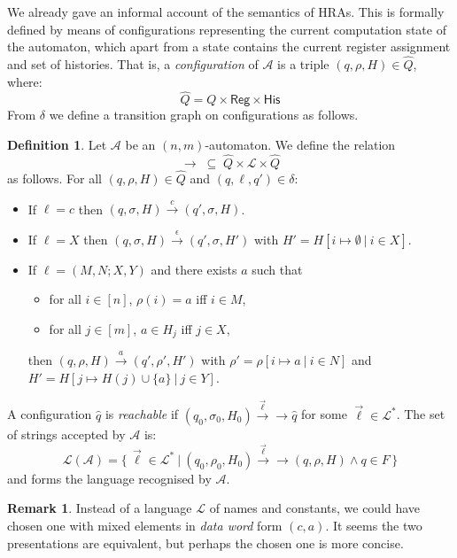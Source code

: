 \documentclass{article}
\theoremstyle{definition}
\newtheorem{remark}[theorem]{Remark}
\newtheorem{definition}[theorem]{Definition}
\renewcommand\AA{\mathcal{A}}
\newcommand\LL{\mathcal{L}}
\newcommand\trdelta[2][]{\overset{#2}\longrightarrow}
\newcommand\trdeltaa[2][]{\overset{#2}\longrightarrow\!\!\!\!\!\!\!\!\!\longrightarrow}
\newcommand\ells{\vec{\ell}}
\newcommand\reg{\mathsf{Reg}}
\newcommand\his{\mathsf{His}}
\newcommand\ta{,}
\begin{document}
We already gave an informal account of the semantics of HRAs. 
This is formally defined by means of {configurations} representing the current computation state of the automaton, which apart from a state contains the current register assignment and set of histories. That is,
a \emph{configuration} of $\AA$ is a triple $(q,\rho,H)\in\hat{Q}$, where:
\[ \hat{Q}=Q\times\reg \times \his\]
From $\delta$ we define a transition graph on configurations as follows. 

\begin{definition}
Let $\AA$ be an $(n,m)$-automaton. We define the relation
\[ \trdelta{}\;\subseteq\;\hat Q\times\LL\times\hat Q \]
as follows.
For all $(q,\rho,H)\in\hat{Q}$ and $(q,\ell,q')\in\delta$:
\begin{itemize}
 \item If $\ell=c$ then $(q,\sigma,H)\trdelta{c}(q',\sigma,H)$.
 \item If $\ell=X$ then $(q,\sigma,H)\trdelta{\epsilon}(q',\sigma,H')$ with $H'=H[i\mapsto\emptyset\ |\ i\in X]$.
 \item If $\ell=(M\ta N;X\ta Y)$ and there exists $a$ such that
 \begin{itemize}
   \item for all $i\in[n]$, $\rho(i)=a$ iff $i\in M$,
   \item for all $j\in[m]$, $a\in H_j$ iff $j\in X$,   
 \end{itemize}
 then $(q,\rho,H)\trdelta{a}(q',\rho',H')$ with $\rho'=\rho[i\mapsto a\ |\ i\in N]$ and $H'=H[j\mapsto H(j)\cup\{a\}\ |\ j\in Y]$.
\end{itemize}
%
A configuration $\hat{q}$ is \emph{reachable} if $(q_0,\sigma_0,H_0)\trdeltaa{\ells}\hat{q}$ for some $\ells\in\LL^{*}$. 
The set of strings {accepted} by $\AA$ is:
\[
\mathcal{L}(\AA) = \{\,\ells\in\LL^{*}\ |\ (q_0,\rho_0,H_0)\trdeltaa{\ells}(q,\rho,H) \land q\in F\,\}
\]
and forms the language recognised by $\AA$.
\end{definition}

\begin{remark}
Instead of a language $\LL$ of names and constants, we could have chosen one with mixed elements in \emph{data word} form
$(c,a)$. It seems the two presentations are equivalent, but perhaps the chosen one is more concise.
\end{remark}
\end{document}

